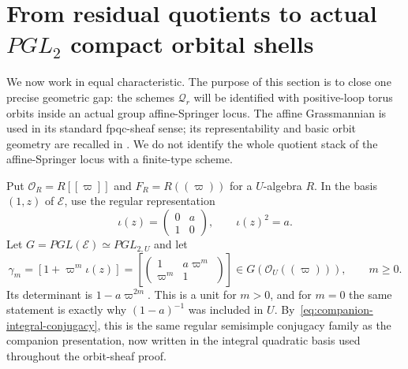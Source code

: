 \documentclass[11pt]{article}
\theoremstyle{definition}
\theoremstyle{remark}
\begin{document}
\section{From residual quotients to actual
\texorpdfstring{$PGL_2$}{PGL2} compact orbital shells}
\label{sec:PGL2-orbital-comparison}

We now work in equal characteristic.  The purpose of this section is to close
one precise geometric gap: the schemes $\mathscr Q_r$ will be identified with
positive-loop torus orbits inside an actual group affine-Springer locus.  The
affine Grassmannian is used in its standard fpqc-sheaf sense; its
representability and basic orbit geometry are recalled in
\cite{PappasRapoport,ZhuAffineGrassmannians}.  We do not identify the whole
quotient stack of the affine-Springer locus with a finite-type scheme.

Put $\mathcal O_R=R[[\varpi]]$ and $F_R=R((\varpi))$ for a $U$-algebra $R$.
In the basis $(1,z)$ of $\mathcal E$, use the regular representation
\begin{equation}
 \iota(z)=
 \begin{pmatrix}0&a\\1&0\end{pmatrix},
 \qquad \iota(z)^2=a.
 \label{eq:PGL2-quadratic-embedding}
\end{equation}
Let $G=PGL(\mathcal E)\simeq PGL_{2,U}$ and let
\begin{equation}
 \gamma_m=\left[1+\varpi^m\iota(z)\right]
 =\left[\begin{pmatrix}1&a\varpi^m\\\varpi^m&1\end{pmatrix}\right]
 \in G(\mathcal O_U((\varpi))),\qquad m\ge0.
 \label{eq:PGL2-universal-gamma}
\end{equation}
Its determinant is $1-a\varpi^{2m}$.  This is a unit for $m>0$, and for
$m=0$ the same statement is exactly why $(1-a)^{-1}$ was included in $U$.
By~\eqref{eq:companion-integral-conjugacy}, this is the same regular
semisimple conjugacy family as the companion presentation, now written in the
integral quadratic basis used throughout the orbit-sheaf proof.
\end{document}
